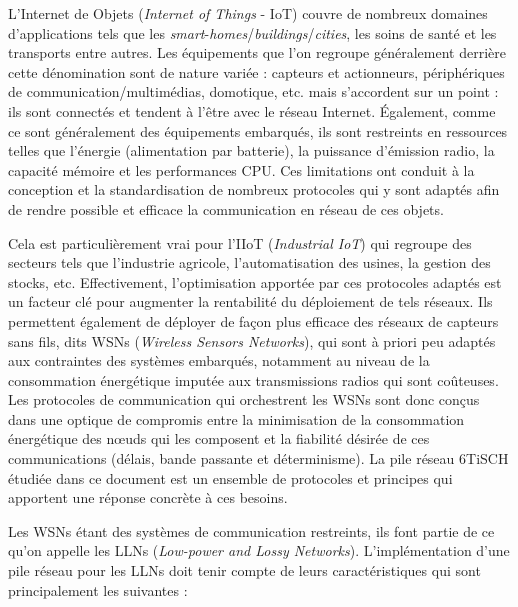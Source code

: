\documentclass[]{report}
\begin{document}
L'Internet de Objets (\textit{Internet of Things }- IoT) couvre de nombreux domaines d'applications tels que les \textit{smart}-\textit{homes}/\textit{buildings}/\textit{cities}, les soins de santé et les transports entre autres. Les équipements que l'on regroupe généralement derrière cette dénomination sont de nature variée : capteurs et actionneurs, périphériques de communication/multimédias, domotique, etc. mais s'accordent sur un point : ils sont connectés et tendent à l'être avec le réseau Internet. Également, comme ce sont généralement des équipements embarqués, ils sont restreints en ressources telles que l'énergie (alimentation par batterie), la puissance d'émission radio, la capacité mémoire et les performances CPU. Ces limitations ont conduit à la conception et la standardisation de nombreux protocoles qui y sont adaptés afin de rendre possible et efficace la communication en réseau de ces objets.\\

\par Cela est particulièrement vrai pour l'IIoT (\textit{Industrial IoT}) qui regroupe des secteurs tels que l'industrie agricole, l'automatisation des usines, la gestion des stocks, etc. Effectivement, l'optimisation apportée par ces protocoles adaptés est un facteur clé pour augmenter la rentabilité du déploiement de tels réseaux. Ils permettent également de déployer de façon plus efficace des réseaux de capteurs sans fils, dits WSNs (\textit{Wireless Sensors Networks}), qui sont à priori peu adaptés aux contraintes des systèmes embarqués, notamment au niveau de la consommation énergétique imputée aux transmissions radios qui sont coûteuses. Les protocoles de communication qui orchestrent les WSNs sont donc conçus dans une optique de compromis entre la minimisation de la consommation énergétique des nœuds qui les composent et la fiabilité désirée de ces communications (délais, bande passante et déterminisme). La pile réseau 6TiSCH étudiée dans ce document est un ensemble de protocoles et principes qui apportent une réponse concrète à ces besoins.\\

\par Les WSNs étant des systèmes de communication restreints, ils font partie de ce qu'on appelle les LLNs (\textit{Low-power and Lossy Networks}). L'implémentation d'une pile réseau pour les LLNs doit tenir compte de leurs caractéristiques qui sont principalement les suivantes :\\
\end{document}
